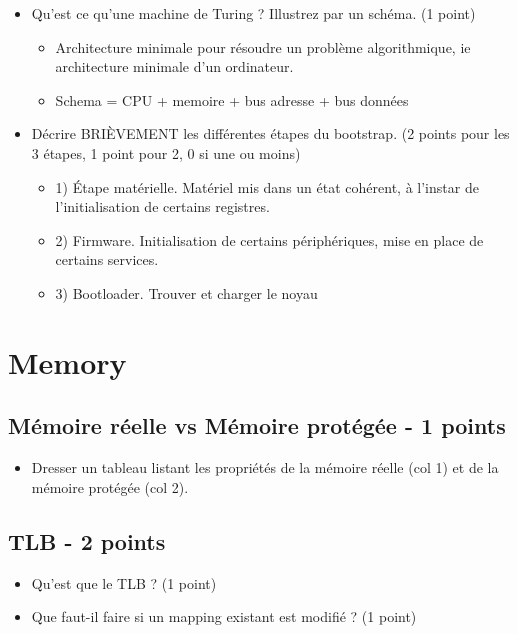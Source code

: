 \begin{correction}
\begin{itemize}
  \item Qu'est ce qu'une machine de Turing ? Illustrez par un schéma. (1 point)
  \begin{itemize}
        \item Architecture minimale pour résoudre un problème algorithmique, ie architecture minimale d'un ordinateur.
        \item Schema = CPU + memoire + bus adresse + bus données
  \end{itemize}

  \item Décrire BRIÈVEMENT les différentes étapes du bootstrap. (2 points pour les 3 étapes, 1 point pour 2, 0 si une ou moins)
  \begin{itemize}
     \item 1) \'Etape matérielle.  Matériel mis dans un état cohérent, à l'instar de l'initialisation de certains registres.
     \item 2) Firmware. Initialisation de certains périphériques, mise en place de certains services.
     \item 3) Bootloader. Trouver et charger le noyau
  \end{itemize}
\end{itemize}

\end{correction}

%
%

\section{Memory
         {\hfill{} }}


\subsection{Mémoire réelle vs Mémoire protégée - 1 points}
\begin{itemize}
   \item Dresser un tableau listant les propriétés de la mémoire réelle (col 1) et de la mémoire protégée (col 2).
\end{itemize}

\subsection{TLB - 2 points}
\begin{itemize}
   \item Qu'est que le TLB ? (1 point)
   \item Que faut-il faire si un mapping existant est modifié ? (1 point)
\end{itemize}


